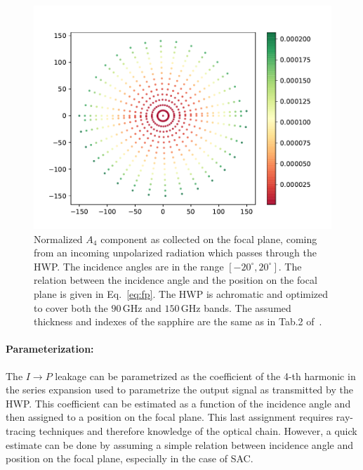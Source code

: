 \begin{figure}
\begin{center}
\includegraphics{figures/A4_focalPlane.pdf}
\end{center}
\caption{Normalized $A_4$ component as collected on the focal plane, coming from an incoming unpolarized radiation which passes through the HWP. The incidence angles are in the range $[-20^\circ,20^\circ]$. The relation between the incidence angle and the position on the focal plane is given in Eq.~\ref{eq:fp}. The HWP is achromatic and optimized to cover both the $90\,\mathrm{GHz}$ and $150\,\mathrm{GHz}$ bands. The assumed thickness and indexes of the sapphire are the same as in Tab.2 of~\cite{PB2a_WHWP}.}\label{fig:ip_fp}
\end{figure}

\paragraph{Parameterization:}
The $I\rightarrow P$ leakage can be parametrized as the coefficient of the 4-th harmonic in the series expansion used to parametrize the output signal as transmitted by the HWP. This coefficient can be estimated as a function of the incidence angle and then assigned to a position on the focal plane. This last assignment requires ray-tracing techniques and therefore knowledge of the optical chain. However, a quick estimate can be done by assuming a simple relation between incidence angle and position on the focal plane, especially in the case of SAC.
